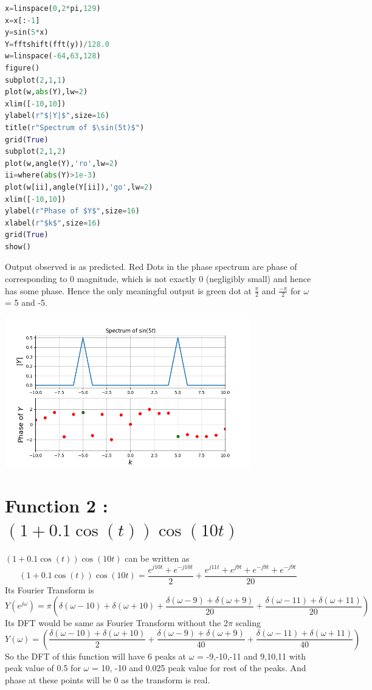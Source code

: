 \documentclass[a4paper]{article}
\begin{document}
\begin{lstlisting}[language=Python]
x=linspace(0,2*pi,129)
x=x[:-1]
y=sin(5*x)
Y=fftshift(fft(y))/128.0
w=linspace(-64,63,128)
figure()
subplot(2,1,1)
plot(w,abs(Y),lw=2)
xlim([-10,10])
ylabel(r"$|Y|$",size=16)
title(r"Spectrum of $\sin(5t)$")
grid(True)
subplot(2,1,2)
plot(w,angle(Y),'ro',lw=2)
ii=where(abs(Y)>1e-3)
plot(w[ii],angle(Y[ii]),'go',lw=2)
xlim([-10,10])
ylabel(r"Phase of $Y$",size=16)
xlabel(r"$k$",size=16)
grid(True)
show()
\end{lstlisting}
Output observed is as predicted. Red Dots in the phase spectrum are phase of corresponding to 0 magnitude, which is not exactly 0 (negligibly small) and hence has some phase. Hence the only meaningful output is green dot at $\frac{\pi}{2}$ and $\frac{-\pi}{2}$ for $\omega$ = 5 and -5.

\begin{center}
\includegraphics[width=0.8\textwidth]{Figure_1.png}
\end{center}
\section{Function 2 : $\left(1+0.1\cos\left(t\right)\right)\cos\left(10t\right)$}
$\left(1+0.1\cos\left(t\right)\right)\cos\left(10t\right)$ can be written as $$\left(1+0.1\cos\left(t\right)\right)\cos\left(10t\right) = \frac{e^{j10t} + e^{-j10t}}{2} + \frac{e^{j11t}+ e^{j9t} + e^{-j9t} + e^{-j9t}}{20}$$
Its Fourier Transform is $$Y(e^{j\omega}) = \pi (\delta(\omega - 10) + \delta(\omega + 10) + \frac{\delta(\omega - 9) + \delta(\omega + 9)}{20} + \frac{\delta(\omega - 11) + \delta(\omega + 11)}{20})$$
Its DFT would be same as Fourier Transform without the 2$\pi$ scaling $$Y(\omega) =  (\frac{\delta(\omega - 10) + \delta(\omega + 10)}{2} + \frac{\delta(\omega - 9) + \delta(\omega + 9)}{40} + \frac{\delta(\omega - 11) + \delta(\omega + 11)}{40})$$
So the DFT of this function will have 6 peaks at $\omega$ = -9,-10,-11 and 9,10,11 with peak value of 0.5 for $\omega$ = 10, -10 and 0.025 peak value for rest of the peaks. And phase at these points will be 0 as the transform is real.
\end{document}
